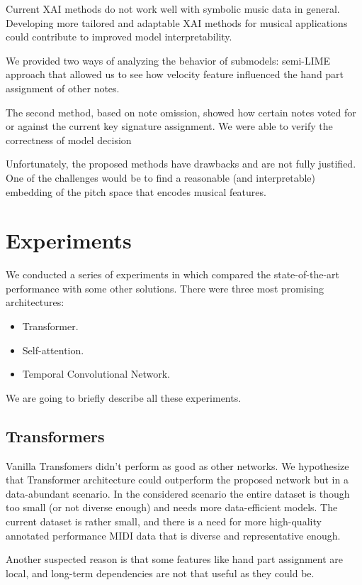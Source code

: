 Current XAI methods do not work well with symbolic music data in general. Developing more tailored and adaptable XAI methods for musical applications could contribute to improved model interpretability. 

We provided two ways of analyzing the behavior of submodels: semi-LIME approach that allowed us to see how velocity feature influenced the hand part assignment of other notes.

The second method, based on note omission, showed how certain notes voted for or against the current key signature assignment. We were able to verify the correctness of model decision 

Unfortunately, the proposed methods have drawbacks and are not fully justified. One of the challenges would be to find a reasonable (and interpretable) embedding of the pitch space that encodes musical features. 

\section{Experiments}

We conducted a series of experiments in which compared the state-of-the-art performance with some other solutions. There were three most promising architectures: \begin{itemize}
	\item Transformer.
	\item Self-attention.
	\item Temporal Convolutional Network.
\end{itemize}

We are going to briefly describe all these experiments.

\subsection{Transformers}

Vanilla Transfomers didn't perform as good as other networks. We hypothesize that Transformer architecture could outperform the proposed network but in a data-abundant scenario. In the considered scenario the entire dataset is though too small (or not diverse enough) and needs more data-efficient models. The current dataset is rather small, and there is a need for more high-quality annotated performance MIDI data that is diverse and representative enough.

Another suspected reason is that some features like hand part assignment are local, and long-term dependencies are not that useful as they could be. 

